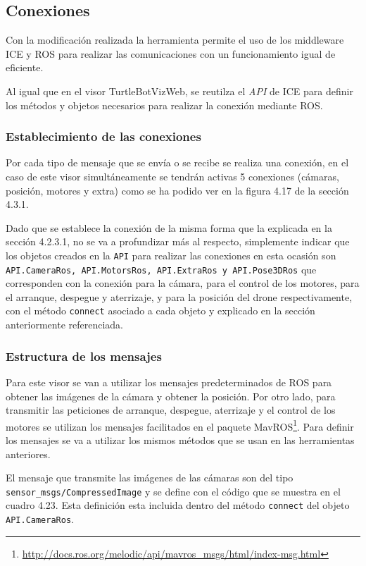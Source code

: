 \subsection{Conexiones}

Con la modificación realizada la herramienta permite el uso de los middleware ICE y ROS para realizar las comunicaciones con un funcionamiento igual de eficiente.

Al igual que en el visor TurtleBotVizWeb, se reutilza el \textit{API} de ICE para definir los métodos y objetos necesarios para realizar la conexión mediante ROS.

\subsubsection{Establecimiento de las conexiones}

Por cada tipo de mensaje que se envía o se recibe se realiza una conexión, en el caso de este visor simultáneamente se tendrán activas 5 conexiones (cámaras, posición, motores y extra) como se ha podido ver en la figura 4.17 de la sección 4.3.1.

Dado que se establece la conexión de la misma forma que la explicada en la sección 4.2.3.1, no se va a profundizar más al respecto, simplemente indicar que los objetos creados en la \texttt{API} para realizar las conexiones en esta ocasión son \texttt{API.CameraRos, API.MotorsRos, API.ExtraRos y API.Pose3DRos} que corresponden con la conexión para la cámara, para el control de los motores, para el arranque, despegue y aterrizaje, y para la posición del drone respectivamente, con el método \texttt{connect} asociado a cada objeto y explicado en la sección anteriormente referenciada.

\subsubsection{Estructura de los mensajes}

Para este visor se van a utilizar los mensajes predeterminados de ROS para obtener las imágenes de la cámara y obtener la posición. Por otro lado, para transmitir las peticiones de arranque, despegue, aterrizaje y el control de los motores se utilizan los mensajes facilitados en el paquete MavROS\footnote{\url{http://docs.ros.org/melodic/api/mavros_msgs/html/index-msg.html}}. Para definir los mensajes se va a utilizar los mismos métodos que se usan en las herramientas anteriores.

El mensaje que transmite las imágenes de las cámaras son del tipo \texttt{sensor\_msgs/CompressedImage} y se define con el código que se muestra en el cuadro 4.23. Esta definición esta incluida dentro del método \texttt{connect} del objeto \texttt{API.CameraRos}.

